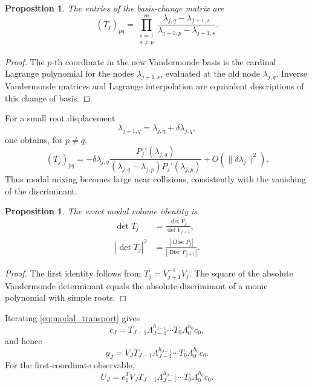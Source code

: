 \documentclass[11pt]{amsart}
\numberwithin{equation}{section}
\theoremstyle{plain}
\newtheorem{proposition}[theorem]{Proposition}
\theoremstyle{definition}
\theoremstyle{remark}
\begin{document}
\begin{proposition}
\label{prop:lagrange_transport}
The entries of the basis-change matrix are
\begin{equation}
(T_j)_{pq}
=
\prod_{\substack{s=1\\s\neq p}}^{m}
\frac{\lambda_{j,q}-\lambda_{j+1,s}}
{\lambda_{j+1,p}-\lambda_{j+1,s}}.
\label{eq:lagrange_transport_entries}
\end{equation}
\end{proposition}

\begin{proof}
The $p$-th coordinate in the new Vandermonde basis is the cardinal Lagrange polynomial for the nodes $\lambda_{j+1,s}$, evaluated at the old node $\lambda_{j,q}$.  Inverse Vandermonde matrices and Lagrange interpolation are equivalent descriptions of this change of basis.
\end{proof}

For a small root displacement
\begin{equation}
\lambda_{j+1,q}=\lambda_{j,q}+\delta\lambda_{j,q},
\label{eq:small_root_displacement}
\end{equation}
one obtains, for $p\neq q$,
\begin{equation}
(T_j)_{pq}
=-\delta\lambda_{j,q}
\frac{P_j'(\lambda_{j,q})}
{(\lambda_{j,q}-\lambda_{j,p})P_j'(\lambda_{j,p})}
+O(\|\delta\lambda_j\|^2).
\label{eq:offdiagonal_modal_mixing}
\end{equation}
Thus modal mixing becomes large near collisions, consistently with the vanishing of the discriminant.

\begin{proposition}
\label{prop:modal_volume}
The exact modal volume identity is
\begin{align}
\det T_j
&=\frac{\det V_j}{\det V_{j+1}},
\label{eq:transport_determinant}\\
|\det T_j|^2
&=\frac{|\operatorname{Disc}P_j|}
{|\operatorname{Disc}P_{j+1}|}.
\label{eq:discriminant_volume_ratio}
\end{align}
\end{proposition}

\begin{proof}
The first identity follows from $T_j=V_{j+1}^{-1}V_j$.  The square of the absolute Vandermonde determinant equals the absolute discriminant of a monic polynomial with simple roots.
\end{proof}

Iterating \eqref{eq:modal_transport} gives
\begin{equation}
c_J
=T_{J-1}\Lambda_{J-1}^{h_{J-1}}
\cdots
T_0\Lambda_0^{h_0}c_0,
\label{eq:iterated_modal_transport}
\end{equation}
and hence
\begin{equation}
y_J
=V_JT_{J-1}\Lambda_{J-1}^{h_{J-1}}
\cdots
T_0\Lambda_0^{h_0}c_0.
\label{eq:global_state_predictor}
\end{equation}
For the first-coordinate observable,
\begin{equation}
U_J
=e_1^TV_JT_{J-1}\Lambda_{J-1}^{h_{J-1}}
\cdots
T_0\Lambda_0^{h_0}c_0.
\label{eq:global_scalar_predictor}
\end{equation}
\end{document}
